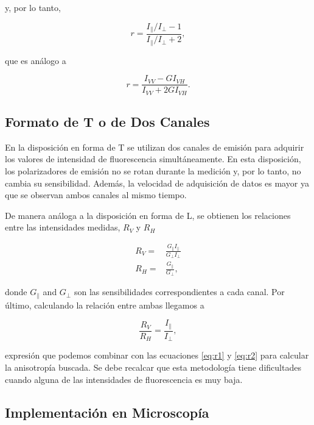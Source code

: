 \noindent y, por lo tanto,

\begin{equation}
    r = \frac{I_{\parallel}/I_{\perp} - 1}{I_{\parallel}/I_{\perp} +2},
    \label{eq:r1}
\end{equation}

\noindent que es análogo a

\begin{equation}
    r = \frac{I_{VV}-GI_{VH}}{I_{VV}+2GI_{VH}}.
    \label{eq:r2}
\end{equation}

\subsection{Formato de T o de Dos Canales}

En la disposición en forma de T se utilizan dos canales de emisión para adquirir los valores de intensidad de fluorescencia simultáneamente. En esta disposición, los polarizadores de emisión no se rotan durante la medición y, por lo tanto, no cambia su sensibilidad. Además, la velocidad de adquisición de datos es mayor ya que se observan ambos canales al mismo tiempo.

De manera análoga a la disposición en forma de L, se obtienen los relaciones entre las intensidades medidas, $R_V$ y $R_H$

\begin{align}
    R_V =& \frac{G_{\parallel} I_{\parallel}}{G_{\perp} I_{\perp}} \\
    R_H =& \frac{G_{\parallel}}{G_{\perp}},
\end{align}

\noindent donde $G_{\parallel}$ and $G_{\perp}$ son las sensibilidades correspondientes a cada canal. Por último, calculando la relación entre ambas llegamos a

\begin{equation}
    \frac{R_V}{R_H} = \frac{I_{\parallel}}{I_{\perp}},
\end{equation}

\noindent expresión que podemos combinar con las ecuaciones \ref{eq:r1} y \ref{eq:r2} para calcular la anisotropía buscada. Se debe recalcar que esta metodología tiene dificultades cuando alguna de las intensidades de fluorescencia es muy baja.

\subsection{Implementación en Microscopía}

